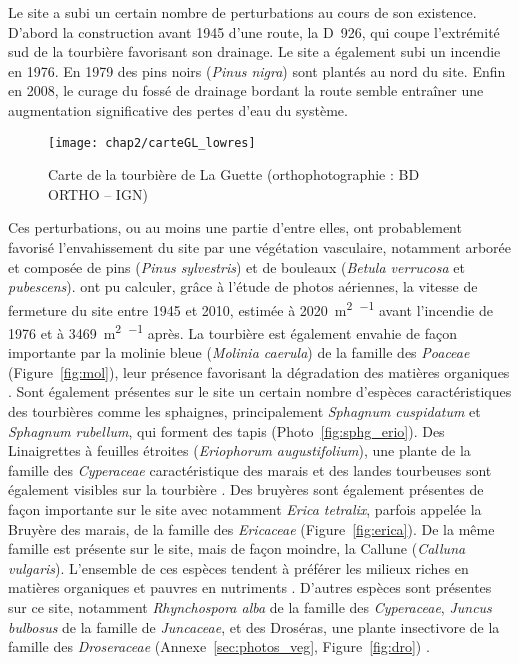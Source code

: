 Le site a subi un certain nombre de perturbations au cours de son existence.
D'abord la construction avant 1945 d'une route, la D~926, qui coupe l'extrémité sud de la tourbière favorisant son drainage.
Le site a également subi un incendie en 1976.
En 1979 des pins noirs (\textit{Pinus nigra}) sont plantés au nord du site.
Enfin en 2008, le curage du fossé de drainage bordant la route semble entraîner une augmentation significative des pertes d'eau du système.

\begin{figure}
\texttt{[image: chap2/carteGL\_lowres]}
\caption{Carte de la tourbière de La Guette (orthophotographie : BD ORTHO\textsuperscript{\textregistered} -- IGN)}
\label{fig:carte_LG}
\end{figure}

Ces perturbations, ou au moins une partie d'entre elles, ont probablement favorisé l'envahissement du site par une végétation vasculaire, notamment arborée et composée de pins (\textit{Pinus sylvestris}) et de bouleaux (\textit{Betula verrucosa} et \textit{pubescens}).
\citet{viel2015} ont pu calculer, grâce à l'étude de photos aériennes, la vitesse de fermeture du site entre 1945 et 2010, estimée à \SI{2020}{\square\metre\per\year} avant l'incendie de 1976 et à \SI{3469}{\square\metre\per\year} après.
La tourbière est également envahie de façon importante par la molinie bleue (\textit{Molinia caerula}) de la famille des \textit{Poaceae} (Figure~\ref{fig:mol}), leur présence favorisant la dégradation des matières organiques \citep{gogo2011}.
Sont également présentes sur le site un certain nombre d'espèces caractéristiques des tourbières comme les sphaignes, principalement \textit{Sphagnum cuspidatum} et \textit{Sphagnum rubellum}, qui forment des tapis (Photo~\ref{fig:sphg_erio}).
Des Linaigrettes à feuilles étroites (\textit{Eriophorum augustifolium}), une plante de la famille des \textit{Cyperaceae} caractéristique des marais et des landes tourbeuses sont également visibles sur la tourbière \citep{rameau2008}.
Des bruyères sont également présentes de façon importante sur le site avec notamment \textit{Erica tetralix}, parfois appelée la Bruyère des marais, de la famille des \textit{Ericaceae} (Figure~\ref{fig:erica}).
De la même famille est présente sur le site, mais de façon moindre, la Callune (\textit{Calluna vulgaris}).
L'ensemble de ces espèces tendent à préférer les milieux riches en matières organiques et pauvres en nutriments \citep{rameau2008}.
D'autres espèces sont présentes sur ce site, notamment \textit{Rhynchospora alba} de la famille des \textit{Cyperaceae}, \textit{Juncus bulbosus} de la famille de \textit{Juncaceae}, et des Droséras, une plante insectivore de la famille des \textit{Droseraceae} (Annexe~\ref{sec:photos_veg}, Figure~\ref{fig:dro}) . 

